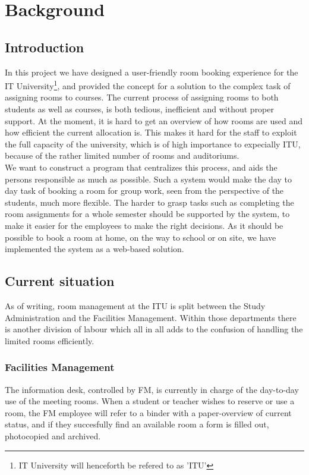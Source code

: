 \chapter{Background}
\section{Introduction}
In this project we have designed a user-friendly room booking experience for the IT University\footnote{IT University will henceforth be refered to as 'ITU'}, and provided the concept for a solution to the complex task of assigning rooms to courses. The current process of assigning rooms to both students as well as courses, is both tedious, inefficient and without proper support. At the moment, it is hard to get an overview of how rooms are used and how efficient the current allocation is. This makes it hard for the staff to exploit the full capacity of the university, which is of high importance to expecially ITU, because of the rather limited number of rooms and auditoriums. \\

We want to construct a program that centralizes this process, and aids the persons responsible as much as possible. Such a system would make the day to day task of booking a room for group work, seen from the perspective of the students, much more flexible. The harder to grasp tasks such as completing the room assignments for a whole semester should be supported by the system, to make it easier for the employees to make the right decisions. As it should be possible to book a room at home, on the way to school or on site, we have implemented the system as a web-based solution.

\pagebreak
\label{sec:current_situation}
\section{Current situation}
As of writing, room management at the ITU is split between the Study Administration and the Facilities Management. Within those departments there is another division of labour which all in all adds to the confusion of handling the limited rooms efficiently.

\subsection{Facilities Management}
The information desk, controlled by FM, is currently in charge of the day-to-day use of the meeting rooms. When a student or teacher wishes to reserve or use a room, the FM employee will refer to a binder with a paper-overview of current status, and if they succesfully find an available room a form is filled out, photocopied and archived.


